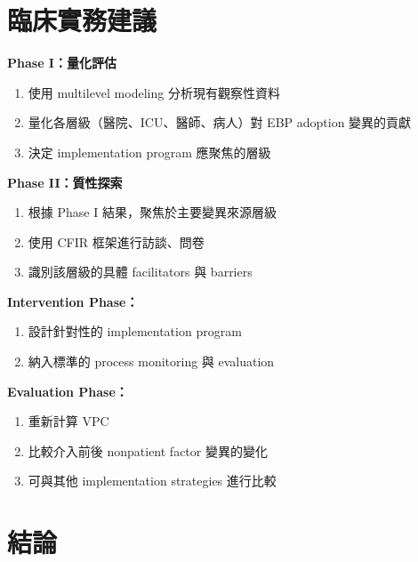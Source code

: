 \documentclass[12pt,a4paper]{article}
\begin{document}
\section{臨床實務建議}

\begin{tcolorbox}[colback=emergency_blue!5!white,colframe=emergency_blue,title=\textbf{Implementation Science 實務應用}]

\textbf{Phase I：量化評估}
\begin{enumerate}
    \item 使用 multilevel modeling 分析現有觀察性資料
    \item 量化各層級（醫院、ICU、醫師、病人）對 EBP adoption 變異的貢獻
    \item 決定 implementation program 應聚焦的層級
\end{enumerate}

\textbf{Phase II：質性探索}
\begin{enumerate}
    \item 根據 Phase I 結果，聚焦於主要變異來源層級
    \item 使用 CFIR 框架進行訪談、問卷
    \item 識別該層級的具體 facilitators 與 barriers
\end{enumerate}

\textbf{Intervention Phase：}
\begin{enumerate}
    \item 設計針對性的 implementation program
    \item 納入標準的 process monitoring 與 evaluation
\end{enumerate}

\textbf{Evaluation Phase：}
\begin{enumerate}
    \item 重新計算 VPC
    \item 比較介入前後 nonpatient factor 變異的變化
    \item 可與其他 implementation strategies 進行比較
\end{enumerate}
\end{tcolorbox}

\section{結論}
\end{document}
